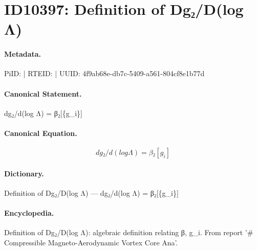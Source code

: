 \section*{ID10397: Definition of Dg₂/D(log Λ)}
\paragraph{Metadata.}
PiID:  | RTEID:  | UUID: 4f9ab68e-db7c-5409-a561-804cf8e1b77d

\paragraph{Canonical Statement.}
dg₂/d(log Λ) = β₂[\{g\_i\}]

\paragraph{Canonical Equation.}
\[
dg₂/d(log Λ) = β₂[{g_i}]
\]

\paragraph{Dictionary.}
Definition of Dg₂/D(log Λ) — dg₂/d(log Λ) = β₂[\{g\_i\}]

\paragraph{Encyclopedia.}
Definition of Dg₂/D(log Λ): algebraic definition relating β, g\_i. From report '\# Compressible Magneto-Aerodynamic Vortex Core Ana'.

